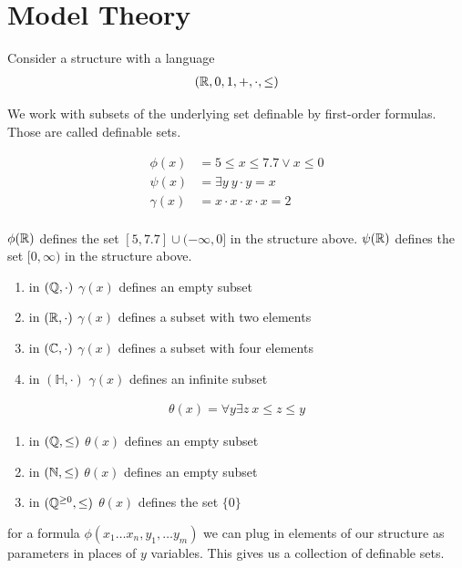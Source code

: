 \documentclass{amsart}
\begin{document}
\section{Model Theory}

Consider a structure with a language
\begin{align*}
	(\mathbb{R}, 0, 1, +, \cdot, \leq)
\end{align*}

We work with subsets of the underlying set definable by first-order formulas.
Those are called definable sets.

\begin{align*}
	\phi(x) &= 5 \leq x \leq 7.7 \vee x \leq 0\\
	\psi(x) &= \exists y \ y \cdot y = x \\
	\gamma(x) &= x \cdot x \cdot x \cdot x = 2 \\
\end{align*}

$\phi(\mathbb{R})$ defines the set $[5, 7.7] \cup (-\infty, 0]$ in the structure above.
$\psi(\mathbb{R})$ defines the set $[0, \infty)$ in the structure above.

\begin{enumerate}
	\item in $(\mathbb{Q}, \cdot)$ $\gamma(x)$ defines an empty subset
	\item in $(\mathbb{R}, \cdot)$ $\gamma(x)$ defines a subset with two elements
	\item in $(\mathbb{C}, \cdot)$ $\gamma(x)$ defines a subset with four elements
	\item in $(\mathbb H, \cdot)$ $\gamma(x)$ defines an infinite subset
\end{enumerate}

\begin{align*}
	\theta(x) = \forall y \exists z \ x \leq z \leq y
\end{align*}

\begin{enumerate}
	\item in $(\mathbb{Q}, \leq)$ $\theta(x)$ defines an empty subset
	\item in $(\mathbb{N}, \leq)$ $\theta(x)$ defines an empty subset
	\item in $(\mathbb{Q}^{\geq 0}, \leq)$ $\theta(x)$ defines the set $\{0\}$
\end{enumerate}

\begin{Definition}
	for a formula $\phi(x_1 \ldots x_n, y_1, \ldots y_m)$ we can plug in elements of our structure as parameters in places of $y$ variables. This gives us a collection of definable sets. 
\end{Definition}
\end{document}
